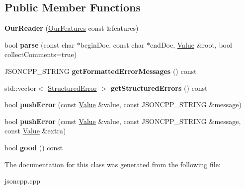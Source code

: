 \subsection*{Public Member Functions}
\begin{DoxyCompactItemize}
\item 
\mbox{\label{classJson_1_1OurReader_a48a850914b9c8d7781be172930c478e5}} 
{\bfseries Our\+Reader} (\hyperlink{classJson_1_1OurFeatures}{Our\+Features} const \&features)
\item 
\mbox{\label{classJson_1_1OurReader_aba4f8749aab7f02ec17f107e392caf80}} 
bool {\bfseries parse} (const char $\ast$begin\+Doc, const char $\ast$end\+Doc, \hyperlink{classJson_1_1Value}{Value} \&root, bool collect\+Comments=true)
\item 
\mbox{\label{classJson_1_1OurReader_a7971de51d73bb4aee5b0c4742c4aaaac}} 
J\+S\+O\+N\+C\+P\+P\+\_\+\+S\+T\+R\+I\+NG {\bfseries get\+Formatted\+Error\+Messages} () const
\item 
\mbox{\label{classJson_1_1OurReader_a0eb2420a6bef89a3f3256191e6e3de6d}} 
std\+::vector$<$ \hyperlink{structJson_1_1OurReader_1_1StructuredError}{Structured\+Error} $>$ {\bfseries get\+Structured\+Errors} () const
\item 
\mbox{\label{classJson_1_1OurReader_a700e9d8e0977fa7e0375d26690d7025f}} 
bool {\bfseries push\+Error} (const \hyperlink{classJson_1_1Value}{Value} \&value, const J\+S\+O\+N\+C\+P\+P\+\_\+\+S\+T\+R\+I\+NG \&message)
\item 
\mbox{\label{classJson_1_1OurReader_addccecfca74b79adaad6115ddd614477}} 
bool {\bfseries push\+Error} (const \hyperlink{classJson_1_1Value}{Value} \&value, const J\+S\+O\+N\+C\+P\+P\+\_\+\+S\+T\+R\+I\+NG \&message, const \hyperlink{classJson_1_1Value}{Value} \&extra)
\item 
\mbox{\label{classJson_1_1OurReader_a63c7d874fa379397e0a5fa65f0843845}} 
bool {\bfseries good} () const
\end{DoxyCompactItemize}


The documentation for this class was generated from the following file\+:\begin{DoxyCompactItemize}
\item 
jsoncpp.\+cpp\end{DoxyCompactItemize}
